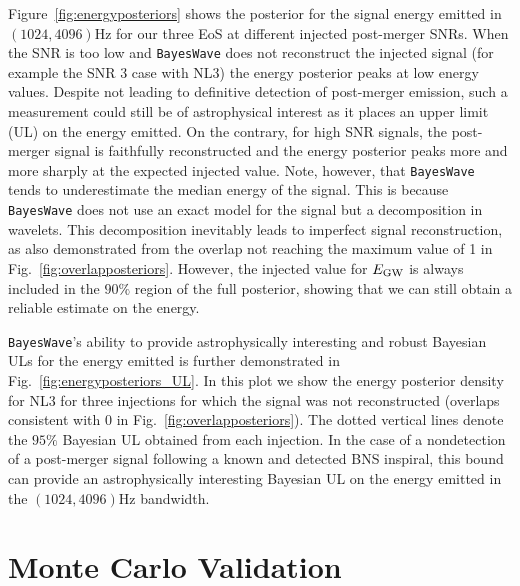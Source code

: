 \documentclass[aps,prd,amsmath,floats,floatfix, twocolumn,
superscriptaddress,nofootinbib,showpacs]{revtex4-1}
\begin{document}
Figure~\ref{fig:energyposteriors} shows the posterior for the signal energy emitted in  $(1024,4096)$Hz for our three EoS at different injected post-merger SNRs. When the SNR is too low and {\tt BayesWave} does not reconstruct the injected signal (for example the SNR 3 case with NL3) the energy posterior peaks at low energy values. Despite not leading to definitive detection of post-merger emission, such a measurement could still be of astrophysical interest as it places an upper limit (UL) on the energy emitted. On the contrary, for high SNR signals, the post-merger signal is faithfully reconstructed and the energy posterior peaks more and more sharply at the expected injected value. Note, however, that {\tt BayesWave} tends to underestimate the median energy of the signal. This is because {\tt BayesWave} does not use an exact model for the signal but a decomposition in wavelets. This decomposition inevitably leads to imperfect signal reconstruction, as also demonstrated from the overlap not reaching the maximum value of 1 in Fig.~\ref{fig:overlapposteriors}. However, the injected value for $E_{\rm{GW}}$ is always included in the $90\%$ region of the full posterior, showing that we can still obtain a reliable estimate on the energy.

{\tt BayesWave}'s ability to provide astrophysically interesting and robust Bayesian ULs for the energy emitted is further demonstrated in Fig.~\ref{fig:energyposteriors_UL}. In this plot we show the energy posterior density for NL3 for three injections for which the signal was not reconstructed (overlaps consistent with $0$ in Fig.~\ref{fig:overlapposteriors}). The dotted vertical lines denote the $95\%$ Bayesian UL obtained from each injection. In the case of a nondetection of a post-merger signal following a known and detected BNS inspiral, this bound can provide an astrophysically interesting Bayesian UL on the energy emitted in the $(1024,4096)$Hz bandwidth.


\section{Monte Carlo Validation}
\label{sec:montecarlo}
\end{document}
